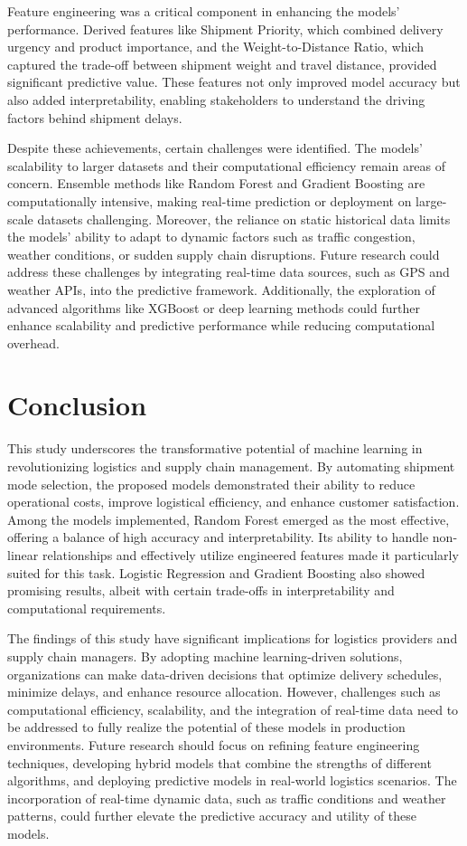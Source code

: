 \documentclass[conference]{IEEEtran}
\begin{document}
Feature engineering was a critical component in enhancing the models’ performance. Derived features like Shipment Priority, which combined delivery urgency and product importance, and the Weight-to-Distance Ratio, which captured the trade-off between shipment weight and travel distance, provided significant predictive value. These features not only improved model accuracy but also added interpretability, enabling stakeholders to understand the driving factors behind shipment delays.

Despite these achievements, certain challenges were identified. The models' scalability to larger datasets and their computational efficiency remain areas of concern. Ensemble methods like Random Forest and Gradient Boosting are computationally intensive, making real-time prediction or deployment on large-scale datasets challenging. Moreover, the reliance on static historical data limits the models' ability to adapt to dynamic factors such as traffic congestion, weather conditions, or sudden supply chain disruptions. Future research could address these challenges by integrating real-time data sources, such as GPS and weather APIs, into the predictive framework. Additionally, the exploration of advanced algorithms like XGBoost or deep learning methods could further enhance scalability and predictive performance while reducing computational overhead.

\section{Conclusion}
This study underscores the transformative potential of machine learning in revolutionizing logistics and supply chain management. By automating shipment mode selection, the proposed models demonstrated their ability to reduce operational costs, improve logistical efficiency, and enhance customer satisfaction. Among the models implemented, Random Forest emerged as the most effective, offering a balance of high accuracy and interpretability. Its ability to handle non-linear relationships and effectively utilize engineered features made it particularly suited for this task. Logistic Regression and Gradient Boosting also showed promising results, albeit with certain trade-offs in interpretability and computational requirements.

The findings of this study have significant implications for logistics providers and supply chain managers. By adopting machine learning-driven solutions, organizations can make data-driven decisions that optimize delivery schedules, minimize delays, and enhance resource allocation. However, challenges such as computational efficiency, scalability, and the integration of real-time data need to be addressed to fully realize the potential of these models in production environments. Future research should focus on refining feature engineering techniques, developing hybrid models that combine the strengths of different algorithms, and deploying predictive models in real-world logistics scenarios. The incorporation of real-time dynamic data, such as traffic conditions and weather patterns, could further elevate the predictive accuracy and utility of these models.
\end{document}
